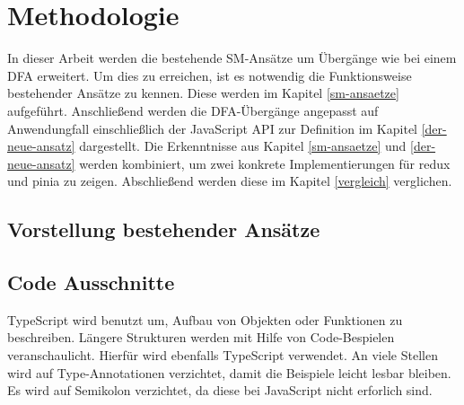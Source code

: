 \chapter{Methodologie}

In dieser Arbeit werden die bestehende SM-Ansätze um Übergänge wie bei einem DFA erweitert. Um dies zu erreichen, ist es notwendig die Funktionsweise bestehender Ansätze zu kennen. Diese werden im Kapitel \ref{sm-ansaetze} aufgeführt. Anschließend werden die DFA-Übergänge angepasst auf Anwendungfall einschließlich der JavaScript API zur Definition im Kapitel \ref{der-neue-ansatz} dargestellt. Die Erkenntnisse aus Kapitel \ref{sm-ansaetze} und \ref{der-neue-ansatz} werden kombiniert, um zwei konkrete Implementierungen für redux und pinia zu zeigen. Abschließend werden diese im Kapitel \ref{vergleich} verglichen.

\section{Vorstellung bestehender Ansätze}



\section{Code Ausschnitte}

TypeScript wird benutzt um, Aufbau von Objekten oder Funktionen zu beschreiben. Längere Strukturen werden mit Hilfe von Code-Bespielen veranschaulicht. Hierfür wird ebenfalls TypeScript verwendet. An viele Stellen wird auf Type-Annotationen verzichtet, damit die Beispiele leicht lesbar bleiben. Es wird auf Semikolon verzichtet, da diese bei JavaScript nicht erforlich sind.